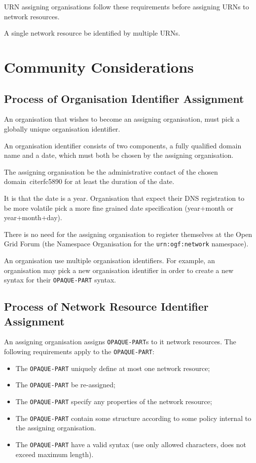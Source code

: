 \documentclass[12pt]{article}  %
\begin{document}
URN assigning organisations \MUST{} follow these requirements before 
assigning URNs to network resources.

A single network resource \MAY{} be identified by multiple URNs. 

\section{Community Considerations}

\subsection{Process of Organisation Identifier Assignment}
\label{sec:orgid-assignment}

An organisation that wishes to become an assigning organisation, must pick a 
globally unique organisation identifier.

An organisation identifier consists of two components, a fully qualified domain 
name and a date, which must both be chosen by the assigning organisation.

The assigning organisation \MUST{} be the administrative contact of the chosen 
domain~cite{rfc5890} for at least the duration of the date.

It is \RECOMMENDED{} that the date is a year. Organisation that expect their 
DNS registration to be more volatile \SHOULD{} pick a more fine grained date 
specification (year+month or year+month+day).

There is no need for the assigning organisation to register themselves at the 
Open Grid Forum (the Namespace Organisation for the \texttt{urn:ogf:network} namespace).

An organisation \MAY{} use multiple organisation identifiers. 
For example, an organisation may pick a new organisation identifier in order 
to create a new syntax for their \texttt{OPAQUE-PART} syntax.

\subsection{Process of Network Resource Identifier Assignment}

An assigning organisation assigns \texttt{OPAQUE-PART}s to 
it network resources. The following requirements apply to the 
\texttt{OPAQUE-PART}:
\begin{itemize}
    \item The \texttt{OPAQUE-PART} \MUST{} uniquely define at most one network resource;
    \item The \texttt{OPAQUE-PART} \MUSTNOT{} be re-assigned;
    \item The \texttt{OPAQUE-PART} \SHOULDNOT{} specify any properties of the network resource;
    \item The \texttt{OPAQUE-PART} \MAY{} contain some structure according to some policy internal to the assigning organisation.
    \item The \texttt{OPAQUE-PART} \MUST{} have a valid syntax (use only allowed characters, does not exceed maximum length).
\end{itemize}
\end{document}
